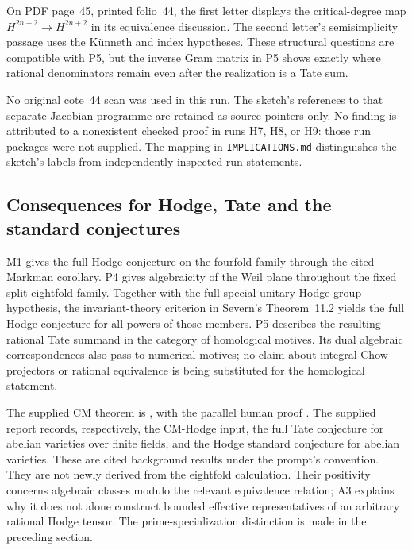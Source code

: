 On PDF page~45, printed folio~44, the first letter displays the critical-degree map $H^{2n-2}\to H^{2n+2}$ in its equivalence discussion. The second letter's semisimplicity passage uses the K\"unneth and index hypotheses. These structural questions are compatible with P5, but the inverse Gram matrix in P5 shows exactly where rational denominators remain even after the realization is a Tate sum.

No original cote~44 scan was used in this run. The sketch's references to that separate Jacobian programme are retained as source pointers only. No finding is attributed to a nonexistent checked proof in runs H7, H8, or H9: those run packages were not supplied. The mapping in \texttt{IMPLICATIONS.md} distinguishes the sketch's labels from independently inspected run statements.

\subsection*{Consequences for Hodge, Tate and the standard conjectures}
M1 gives the full Hodge conjecture on the fourfold family through the cited Markman corollary. P4 gives algebraicity of the Weil plane throughout the fixed split eightfold family. Together with the full-special-unitary Hodge-group hypothesis, the invariant-theory criterion in Severn's Theorem~11.2 yields the full Hodge conjecture for all powers of those members. P5 describes the resulting rational Tate summand in the category of homological motives. Its dual algebraic correspondences also pass to numerical motives; no claim about integral Chow projectors or rational equivalence is being substituted for the homological statement.

The supplied CM theorem is \citet[Theorem~1.1]{OpenAI26}, with the parallel human proof \citet[Theorem~I]{vanHoften26}. The supplied report \citet[Theorems~2.1, 3.1, and~3.5]{Milne26} records, respectively, the CM-Hodge input, the full Tate conjecture for abelian varieties over finite fields, and the Hodge standard conjecture for abelian varieties. These are cited background results under the prompt's convention. They are not newly derived from the eightfold calculation. Their positivity concerns algebraic classes modulo the relevant equivalence relation; A3 explains why it does not alone construct bounded effective representatives of an arbitrary rational Hodge tensor. The prime-specialization distinction is made in the preceding section.
